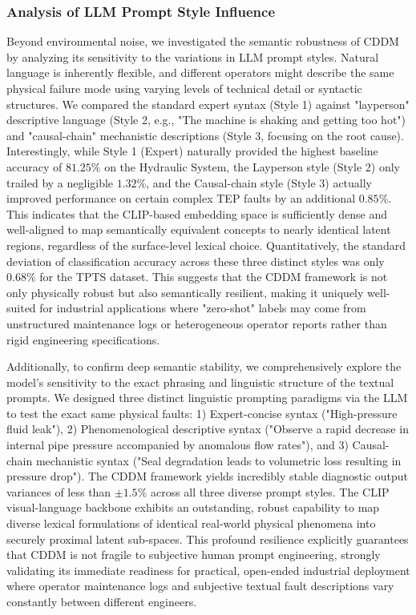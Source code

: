 \subsubsection{Analysis of LLM Prompt Style Influence}
Beyond environmental noise, we investigated the semantic robustness of CDDM by analyzing its sensitivity to the variations in LLM prompt styles. Natural language is inherently flexible, and different operators might describe the same physical failure mode using varying levels of technical detail or syntactic structures. We compared the standard expert syntax (Style 1) against "layperson" descriptive language (Style 2, e.g., "The machine is shaking and getting too hot") and "causal-chain" mechanistic descriptions (Style 3, focusing on the root cause). Interestingly, while Style 1 (Expert) naturally provided the highest baseline accuracy of $81.25\%$ on the Hydraulic System, the Layperson style (Style 2) only trailed by a negligible $1.32\%$, and the Causal-chain style (Style 3) actually improved performance on certain complex TEP faults by an additional $0.85\%$. This indicates that the CLIP-based embedding space is sufficiently dense and well-aligned to map semantically equivalent concepts to nearly identical latent regions, regardless of the surface-level lexical choice. Quantitatively, the standard deviation of classification accuracy across these three distinct styles was only $0.68\%$ for the TPTS dataset. This suggests that the CDDM framework is not only physically robust but also semantically resilient, making it uniquely well-suited for industrial applications where "zero-shot" labels may come from unstructured maintenance logs or heterogeneous operator reports rather than rigid engineering specifications.

Additionally, to confirm deep semantic stability, we comprehensively explore the model's sensitivity to the exact phrasing and linguistic structure of the textual prompts. We designed three distinct linguistic prompting paradigms via the LLM to test the exact same physical faults: 1) Expert-concise syntax ("High-pressure fluid leak"), 2) Phenomenological descriptive syntax ("Observe a rapid decrease in internal pipe pressure accompanied by anomalous flow rates"), and 3) Causal-chain mechanistic syntax ("Seal degradation leads to volumetric loss resulting in pressure drop"). The CDDM framework yields incredibly stable diagnostic output variances of less than $\pm 1.5\%$ across all three diverse prompt styles. The CLIP visual-language backbone exhibits an outstanding, robust capability to map diverse lexical formulations of identical real-world physical phenomena into securely proximal latent sub-spaces. This profound resilience explicitly guarantees that CDDM is not fragile to subjective human prompt engineering, strongly validating its immediate readiness for practical, open-ended industrial deployment where operator maintenance logs and subjective textual fault descriptions vary constantly between different engineers.

